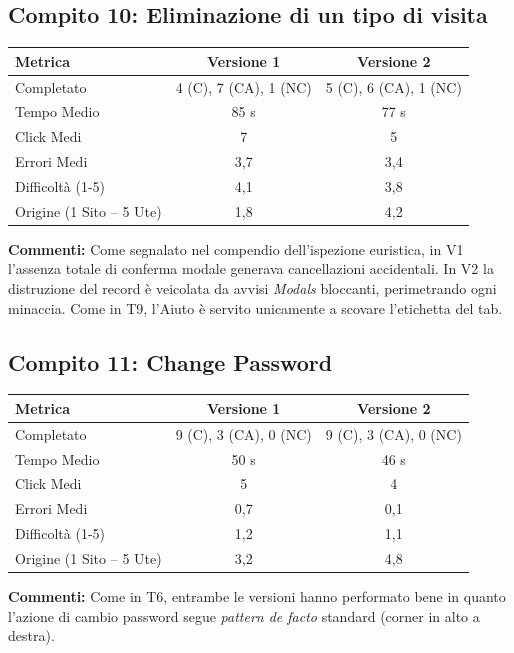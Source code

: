 \subsection{Compito 10: Eliminazione di un tipo di visita}
\begin{table}[H]
\centering
\renewcommand{\arraystretch}{1.2}
\small
\begin{tabular}{|l|c|c|}
\hline
\textbf{Metrica} & \textbf{Versione 1} & \textbf{Versione 2} \\
\hline
Completato & 4 (C), 7 (CA), 1 (NC) & 5 (C), 6 (CA), 1 (NC) \\ \hline
Tempo Medio & 85 s & 77 s \\ \hline
Click Medi & 7 & 5 \\ \hline
Errori Medi & 3,7 & 3,4 \\ \hline
Difficoltà (1-5) & 4,1 & 3,8 \\ \hline
Origine (1 Sito -- 5 Ute) & 1,8 & 4,2 \\ \hline
\end{tabular}
\end{table}
\textbf{Commenti:} Come segnalato nel compendio dell'ispezione euristica, in V1 l'assenza totale di conferma modale generava cancellazioni accidentali. In V2 la distruzione del record è veicolata da avvisi \textit{Modals} bloccanti, perimetrando ogni minaccia. Come in T9, l'Aiuto è servito unicamente a scovare l'etichetta del tab.


\subsection{Compito 11: Change Password}
\begin{table}[H]
\centering
\renewcommand{\arraystretch}{1.2}
\small
\begin{tabular}{|l|c|c|}
\hline
\textbf{Metrica} & \textbf{Versione 1} & \textbf{Versione 2} \\
\hline
Completato & 9 (C), 3 (CA), 0 (NC) & 9 (C), 3 (CA), 0 (NC) \\ \hline
Tempo Medio & 50 s & 46 s \\ \hline
Click Medi & 5 & 4 \\ \hline
Errori Medi & 0,7 & 0,1 \\ \hline
Difficoltà (1-5) & 1,2 & 1,1 \\ \hline
Origine (1 Sito -- 5 Ute) & 3,2 & 4,8 \\ \hline
\end{tabular}
\end{table}
\textbf{Commenti:} Come in T6, entrambe le versioni hanno performato bene in quanto l'azione di cambio password segue \textit{pattern de facto} standard (corner in alto a destra).


